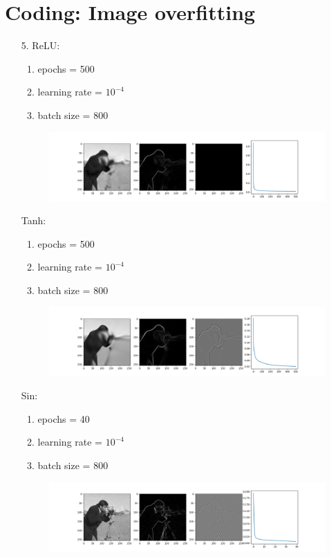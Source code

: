 \documentclass[12pt]{article}
\begin{document}
\section{Coding: Image overfitting}
\begin{enumerate}
    \item[5.]
    ReLU:
    \begin{enumerate}
        \item epochs = 500
        \item learning rate = $10^{-4}$
        \item batch size = 800
    \end{enumerate}
    \begin{figure}[ht]
        \centering
        \includegraphics[width=\linewidth]{relu}
    \end{figure}
    Tanh:
    \begin{enumerate}
        \item epochs = 500
        \item learning rate = $10^{-4}$
        \item batch size = 800
    \end{enumerate}
    \begin{figure}[ht]
        \centering
        \includegraphics[width=\linewidth]{tanh}
    \end{figure}
    \newpage
    Sin:
    \begin{enumerate}
        \item epochs = 40
        \item learning rate = $10^{-4}$
        \item batch size = 800
    \end{enumerate}
    \begin{figure}[ht]
        \centering
        \includegraphics[width=\linewidth]{sin}
    \end{figure}


\end{enumerate}
\end{document}
